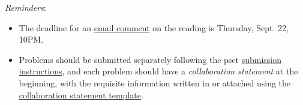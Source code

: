\documentclass[handout]{mcs}
\begin{document}
\renewcommand{\reading}
{
\emph{For this pset}: Chapter~\bref{predicate_sec}{,
      covering \emph{Predicate Formulas}}, Chapter~\bref{data_chap}{,
    covering \emph{Sets \& Relations}}.

\emph{For lecture, Friday, Sept. 23}: Chapter~\bref{mappingrule_sec}{\&
  \bref{infinite_sec}{, on Finite \& Infinite Cardinality}}.}


  \emph{Reminders}:
\begin{itemize}
\item The deadline for an
  \href{http://courses.csail.mit.edu/6.042/fall11/courseinfo#comments}{email
    comment} on the reading is Thursday, Sept. 22, 10PM.
\item Problems should be submitted separately following the pset
  \href{http://courses.csail.mit.edu/6.042/fall11/submission}{submission
    instructions}, and each problem should have a \emph{collaboration
    statement} at the beginning, with the requisite information
  written in or attached using the
  \href{http://courses.csail.mit.edu/6.042/fall11/submission_template.pdf}{collaboration
    statement template}.

 \end{itemize}




\end{document}
